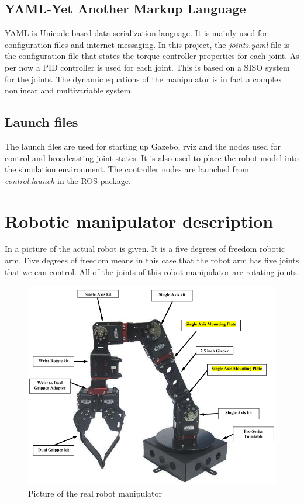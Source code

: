 \subsection{YAML-Yet Another Markup Language}
YAML is Unicode based data serialization language. It is mainly used for configuration files and internet messaging\cite{YAMLdoc}. In this project, the \textit{joints.yaml} file is the configuration file that states the torque controller properties for each joint. As per now a PID controller is used for each joint. This is based on a SISO system for the joints. The dynamic equations of the manipulator is in fact a complex nonlinear and multivariable system\cite{spong}.

\subsection{Launch files}
The launch files are used for starting up Gazebo, rviz and the nodes used for control and broadcasting joint states. It is also used to place the robot model into the simulation environment. The controller nodes are launched from \textit{control.launch} in the ROS package. 



























\section{Robotic manipulator description}
In  a picture of the actual robot is given. It is a five degrees of freedom robotic arm. Five degrees of freedom means in this case that the robot arm has five joints that we can control. All of the joints of this robot manipulator are rotating joints\cite{Crustcrawler}. 
\begin{figure}[htbp]
  \centering
  \includegraphics[width=.7\textwidth]{img/robotAH.png}
  \caption{Picture of the real robot manipulator}
  \label{fig:robotAH}
\end{figure}

